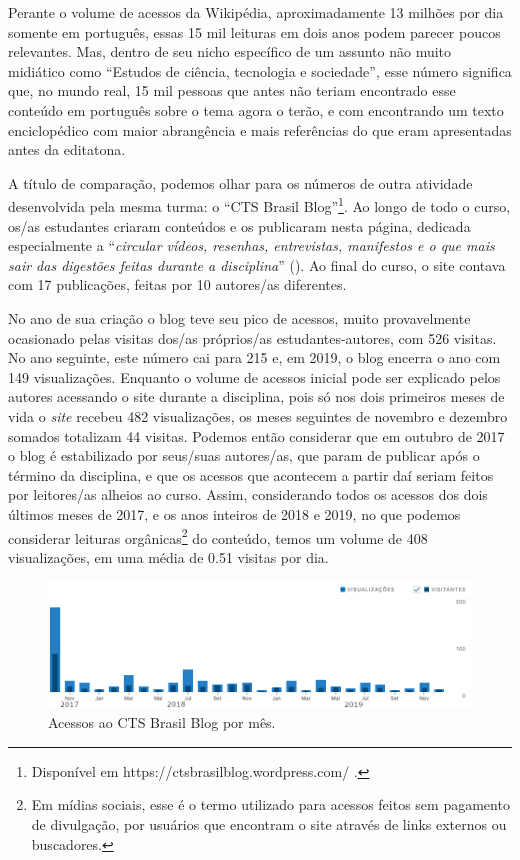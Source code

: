 Perante o volume de acessos da Wikipédia, aproximadamente 13 milhões por dia somente em português, essas 15 mil leituras em dois anos podem parecer poucos relevantes. Mas, dentro de seu nicho específico de um assunto não muito midiático como ``Estudos de ciência, tecnologia e sociedade'', esse número significa que, no mundo real, 15 mil pessoas que antes não teriam encontrado esse conteúdo em português sobre o tema agora o terão, e com encontrando um texto enciclopédico com maior abrangência e mais referências do que eram apresentadas antes da editatona.

A título de comparação, podemos olhar para os números de outra atividade desenvolvida pela mesma turma: o ``CTS Brasil Blog''\footnote{Disponível em https://ctsbrasilblog.wordpress.com/ .}. Ao longo de todo o curso, os/as estudantes criaram conteúdos e os publicaram nesta página, dedicada especialmente a ``\textit{circular vídeos, resenhas, entrevistas, manifestos e o que mais sair das digestões feitas durante a disciplina}'' (\cite{cts_brasil_blog}). Ao final do curso, o site contava com 17 publicações, feitas por 10 autores/as diferentes.

No ano de sua criação o blog teve seu pico de acessos, muito provavelmente ocasionado pelas visitas dos/as próprios/as estudantes-autores, com 526 visitas. No ano seguinte, este número cai para 215 e, em 2019, o blog encerra o ano com 149 visualizações. Enquanto o volume de acessos inicial pode ser explicado pelos autores acessando o site durante a disciplina, pois só nos dois primeiros meses de vida o \textit{site} recebeu 482 visualizações, os meses seguintes de novembro e dezembro somados totalizam 44 visitas. Podemos então considerar que em outubro de 2017 o blog é estabilizado por seus/suas autores/as, que param de publicar após o término da disciplina, e que os acessos que acontecem a partir daí seriam feitos por leitores/as alheios ao curso. Assim, considerando todos os acessos dos dois últimos meses de 2017, e os anos inteiros de 2018 e 2019, no que podemos considerar leituras orgânicas\footnote{Em mídias sociais, esse é o termo utilizado para acessos feitos sem pagamento de divulgação, por usuários que encontram o site através de links externos ou buscadores.} do conteúdo, temos um volume de 408 visualizações, em uma média de 0.51 visitas por dia.

\begin{figure}[H]
    \centering
    \includegraphics[width=1\textwidth]{Images/acessos-cts-brasil.png}
    \caption{Acessos ao CTS Brasil Blog por mês.}
    \label{fig:acessos-cts-brasil}
\end{figure}

